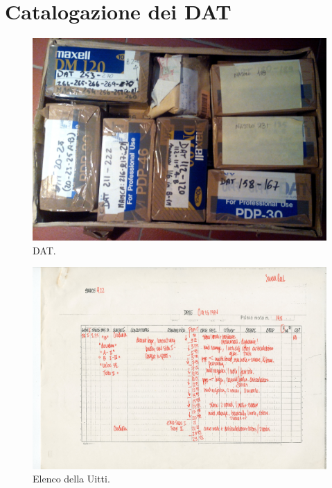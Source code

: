 \appendix
\section{Catalogazione dei DAT}
\begin{figure}[H]
    \centering
    \includegraphics[width=.8\textwidth]{docs/img/box_of_boxes_of_dats-20141125.jpg}
    \caption{DAT.}
\end{figure}
\begin{figure}[H]
    \centering
    \includegraphics[width=.8\textwidth]{docs/img/elenco_Uitti.jpg}
    \caption{Elenco della Uitti.}
\end{figure}

